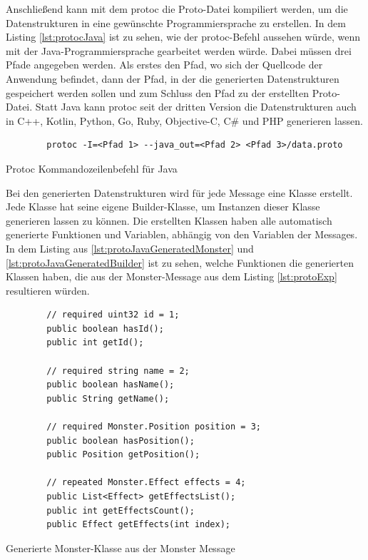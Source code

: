 Anschließend kann mit dem \ac{protoc} die Proto-Datei kompiliert werden, um die Datenstrukturen in eine gewünschte Programmiersprache zu erstellen. In dem Listing \ref{lst:protocJava} ist zu sehen, wie der \ac{protoc}-Befehl aussehen würde, wenn mit der Java-Programmiersprache gearbeitet werden würde. Dabei müssen drei Pfade angegeben werden. Als erstes den Pfad, wo sich der Quellcode der Anwendung befindet, dann der Pfad, in der die generierten Datenstrukturen gespeichert werden sollen und zum Schluss den Pfad zu der erstellten Proto-Datei. Statt Java kann \ac{protoc} seit der dritten Version die Datenstrukturen auch in C++, Kotlin, Python, Go, Ruby, Objective-C, C\# und PHP generieren lassen.\cite{protobufLanguageGuide}\cite{protobufProtocolBufferJava}

\begin{listing}[htp]
    \begin{verbatim} 
        protoc -I=<Pfad 1> --java_out=<Pfad 2> <Pfad 3>/data.proto
    \end{verbatim}
    \caption{Protoc Kommandozeilenbefehl für Java\cite{protobufProtocolBufferJava}}
    \label{lst:protocJava}
\end{listing}

Bei den generierten Datenstrukturen wird für jede Message eine Klasse erstellt. Jede Klasse hat seine eigene Builder-Klasse, um Instanzen dieser Klasse generieren lassen zu können. Die erstellten Klassen haben alle automatisch generierte Funktionen und Variablen, abhängig von den Variablen der Messages. In dem Listing aus \ref{lst:protoJavaGeneratedMonster} und \ref{lst:protoJavaGeneratedBuilder} ist zu sehen, welche Funktionen die generierten Klassen haben, die aus der Monster-Message aus dem Listing \ref{lst:protoExp} resultieren würden. 

\begin{listing}[htp]
    \begin{verbatim} 
        // required uint32 id = 1;
        public boolean hasId();
        public int getId();

        // required string name = 2;
        public boolean hasName();
        public String getName();

        // required Monster.Position position = 3;
        public boolean hasPosition();
        public Position getPosition();

        // repeated Monster.Effect effects = 4;
        public List<Effect> getEffectsList();
        public int getEffectsCount();
        public Effect getEffects(int index);
    \end{verbatim}
    \caption{Generierte Monster-Klasse aus der Monster Message}
    \label{lst:protoJavaGeneratedMonster}
\end{listing}


